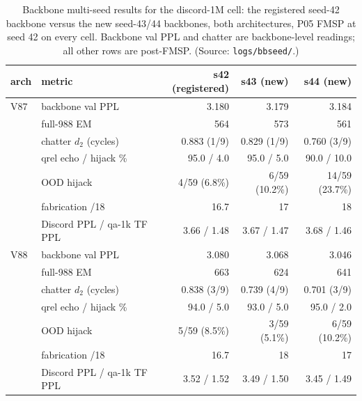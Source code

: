 \documentclass[11pt]{article}
\begin{document}
\begin{table}[!t]
\footnotesize
\caption*{Backbone multi-seed results for the discord-1M cell: the registered seed-42 backbone versus the new seed-43/44 backbones, both architectures, P05 FMSP at seed 42 on every cell. Backbone val PPL and chatter are backbone-level readings; all other rows are post-FMSP. (Source: \texttt{logs/bbseed/}.)}
\centering
\begin{tabular}{llrrr}
\toprule
arch & metric & s42 (registered) & s43 (new) & s44 (new) \\
\midrule
V87 & backbone val PPL & 3.180 & 3.179 & 3.184 \\
    & full-988 EM & 564 & 573 & 561 \\
    & chatter $d_2$ (cycles) & 0.883 (1/9) & 0.829 (1/9) & 0.760 (3/9) \\
    & qrel echo / hijack \% & 95.0 / 4.0 & 95.0 / 5.0 & 90.0 / 10.0 \\
    & OOD hijack & 4/59 (6.8\%) & 6/59 (10.2\%) & 14/59 (23.7\%) \\
    & fabrication /18 & 16.7 & 17 & 18 \\
    & Discord PPL / qa-1k TF PPL & 3.66 / 1.48 & 3.67 / 1.47 & 3.68 / 1.46 \\
\midrule
V88 & backbone val PPL & 3.080 & 3.068 & 3.046 \\
    & full-988 EM & 663 & 624 & 641 \\
    & chatter $d_2$ (cycles) & 0.838 (3/9) & 0.739 (4/9) & 0.701 (3/9) \\
    & qrel echo / hijack \% & 94.0 / 5.0 & 93.0 / 5.0 & 95.0 / 2.0 \\
    & OOD hijack & 5/59 (8.5\%) & 3/59 (5.1\%) & 6/59 (10.2\%) \\
    & fabrication /18 & 16.7 & 18 & 17 \\
    & Discord PPL / qa-1k TF PPL & 3.52 / 1.52 & 3.49 / 1.50 & 3.45 / 1.49 \\
\bottomrule
\end{tabular}
\end{table}
\end{document}
